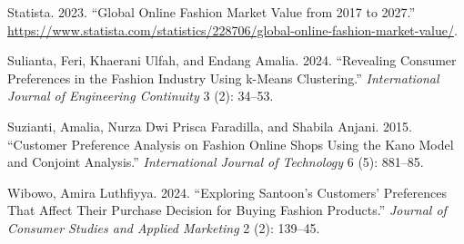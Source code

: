 \documentclass[
  letterpaper,
  DIV=11,
  numbers=noendperiod]{scrartcl}
\newlength{\cslhangindent}
\newenvironment{CSLReferences}[2] %
 {\begin{list}{}{%
  \setlength{\itemindent}{0pt}
  \setlength{\leftmargin}{0pt}
  \setlength{\parsep}{0pt}
  \ifodd #1
   \setlength{\leftmargin}{\cslhangindent}
   \setlength{\itemindent}{-1\cslhangindent}
  \fi
  \setlength{\itemsep}{#2\baselineskip}}}
 {\end{list}}
\begin{document}
\begin{CSLReferences}{1}{0}
Statista. 2023. {``Global Online Fashion Market Value from 2017 to
2027.''}
\url{https://www.statista.com/statistics/228706/global-online-fashion-market-value/}.

Sulianta, Feri, Khaerani Ulfah, and Endang Amalia. 2024. {``Revealing
Consumer Preferences in the Fashion Industry Using k-Means
Clustering.''} \emph{International Journal of Engineering Continuity} 3
(2): 34--53.

Suzianti, Amalia, Nurza Dwi Prisca Faradilla, and Shabila Anjani. 2015.
{``Customer Preference Analysis on Fashion Online Shops Using the Kano
Model and Conjoint Analysis.''} \emph{International Journal of
Technology} 6 (5): 881--85.

Wibowo, Amira Luthfiyya. 2024. {``Exploring Santoon's Customers'
Preferences That Affect Their Purchase Decision for Buying Fashion
Products.''} \emph{Journal of Consumer Studies and Applied Marketing} 2
(2): 139--45.

\end{CSLReferences}
\end{document}
